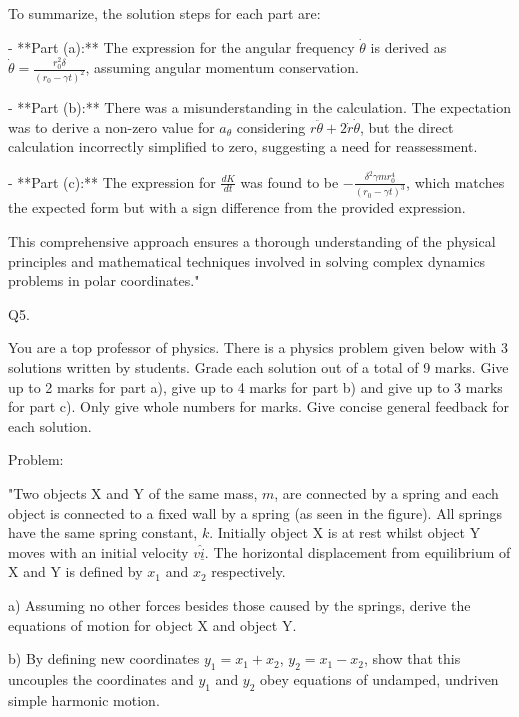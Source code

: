 To summarize, the solution steps for each part are:

- **Part (a):** The expression for the angular frequency \( \dot{\theta} \) is derived as \( \dot{\theta} = \frac{r_{0}^{2} \delta}{(r_{0} - \gamma t)^{2}} \), assuming angular momentum conservation.
  
- **Part (b):** There was a misunderstanding in the calculation. The expectation was to derive a non-zero value for \( a_{\theta} \) considering \( r \ddot{\theta} + 2\dot{r}\dot{\theta} \), but the direct calculation incorrectly simplified to zero, suggesting a need for reassessment.

- **Part (c):** The expression for \( \frac{dK}{dt} \) was found to be \( -\frac{\delta^{2} \gamma m r_{0}^{4}}{(r_{0} - \gamma t)^{3}} \), which matches the expected form but with a sign difference from the provided expression.

This comprehensive approach ensures a thorough understanding of the physical principles and mathematical techniques involved in solving complex dynamics problems in polar coordinates."



                           Q5. 

You are a top professor of physics. There is a physics problem given below with 3 solutions written by students. Grade each solution out of a total of 9 marks. Give up to 2 marks for part a), give up to 4 marks for part b) and give up to 3 marks for part c). Only give whole numbers for marks. Give concise general feedback for each solution.

Problem: 

"Two objects X and Y of the same mass, \( m \), are connected by a spring and each object is connected to a fixed wall by a spring (as seen in the figure). All springs have the same spring constant, \( k \). Initially object X is at rest whilst object Y moves with an initial velocity \( v \hat{\underline{i}} \). The horizontal displacement from equilibrium of X and Y is defined by \( x_{1} \) and \( x_{2} \) respectively. 

a) Assuming no other forces besides those caused by the springs, derive the equations of motion for object X and object Y. 
    
b) By defining new coordinates \( y_{1} = x_{1} + x_{2} \), \( y_{2} = x_{1} - x_{2} \), show that this uncouples the coordinates and \( y_{1} \) and \( y_{2} \) obey equations of undamped, undriven simple harmonic motion. 
    
